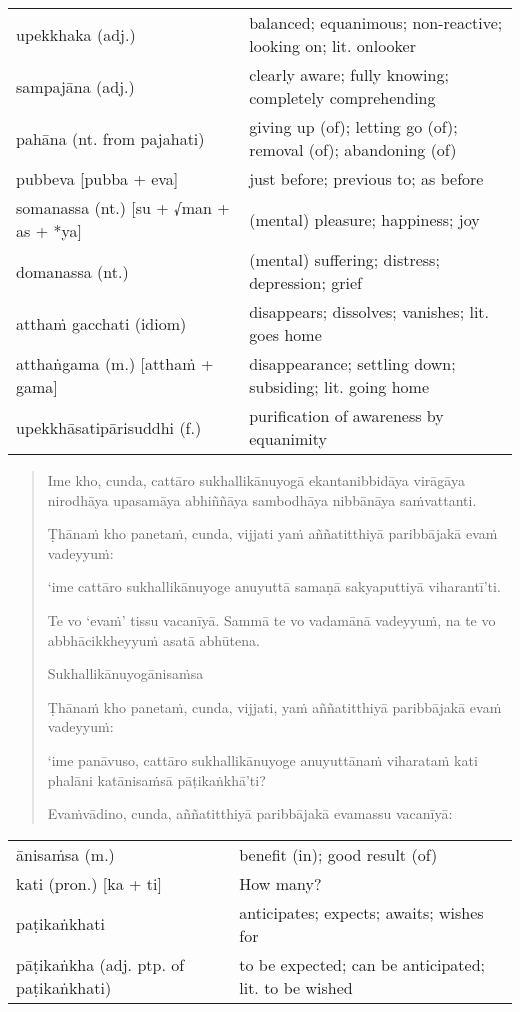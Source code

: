 \documentclass[11pt,oneside]{memoir}
\begin{document}
\begin{longtable}{L{\colOne} L{\colTwo}}
upekkhaka (adj.) & balanced; equanimous; non-reactive; looking on; lit. onlooker\\[0pt]
sampajāna (adj.) & clearly aware; fully knowing; completely comprehending\\[0pt]
pahāna (nt. from pajahati) & giving up (of); letting go (of); removal (of); abandoning (of)\\[0pt]
pubbeva [pubba + eva] & just before; previous to; as before\\[0pt]
somanassa (nt.) [su + √man + as + *ya] & (mental) pleasure; happiness; joy\\[0pt]
domanassa (nt.) & (mental) suffering; distress; depression; grief\\[0pt]
atthaṁ gacchati (idiom) & disappears; dissolves; vanishes; lit. goes home\\[0pt]
atthaṅgama (m.) [atthaṁ + gama] & disappearance; settling down; subsiding; lit. going home\\[0pt]
upekkhāsatipārisuddhi (f.) & purification of awareness by equanimity\\[0pt]
\end{longtable}

\begin{quote}
Ime kho, cunda, cattāro sukhallikānuyogā ekantanibbidāya virāgāya nirodhāya
upasamāya abhiññāya sambodhāya nibbānāya saṁvattanti.

Ṭhānaṁ kho panetaṁ, cunda, vijjati yaṁ aññatitthiyā paribbājakā evaṁ vadeyyuṁ:

‘ime cattāro sukhallikānuyoge anuyuttā samaṇā sakyaputtiyā viharantī’ti.

Te vo ‘evaṁ’ tissu vacanīyā. Sammā te vo vadamānā vadeyyuṁ, na te vo abbhācikkheyyuṁ asatā abhūtena.

Sukhallikānuyogānisaṁsa

Ṭhānaṁ kho panetaṁ, cunda, vijjati, yaṁ aññatitthiyā paribbājakā evaṁ vadeyyuṁ:

‘ime panāvuso, cattāro sukhallikānuyoge anuyuttānaṁ viharataṁ kati phalāni katānisaṁsā pāṭikaṅkhā’ti?

Evaṁvādino, cunda, aññatitthiyā paribbājakā evamassu vacanīyā:
\end{quote}

\clearpage

\begin{longtable}{L{\colOne} L{\colTwo}}
ānisaṁsa (m.) & benefit (in); good result (of)\\[0pt]
kati (pron.) [ka + ti] & How many?\\[0pt]
paṭikaṅkhati & anticipates; expects; awaits; wishes for\\[0pt]
pāṭikaṅkha (adj. ptp. of paṭikaṅkhati) & to be expected; can be anticipated; lit. to be wished\\[0pt]
\end{longtable}
\end{document}
